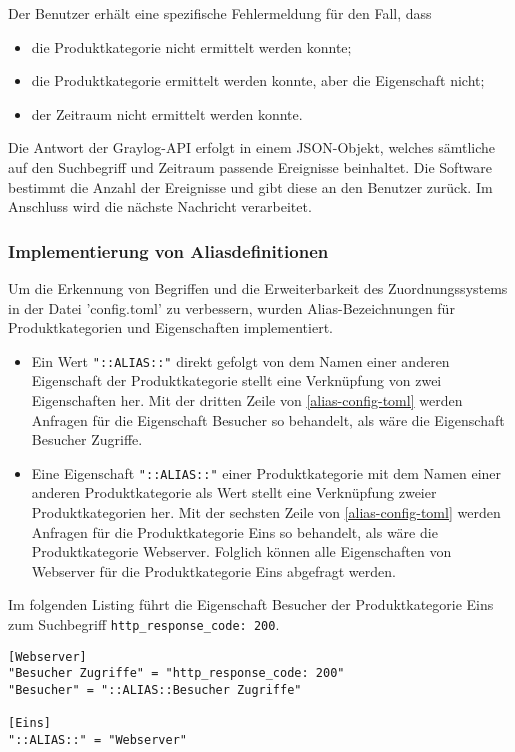 Der Benutzer erhält eine spezifische Fehlermeldung für den Fall, dass

\begin{itemize}
\item die Produktkategorie nicht ermittelt werden konnte;
\item die Produktkategorie ermittelt werden konnte, aber die Eigenschaft nicht;
\item der Zeitraum nicht ermittelt werden konnte.
\end{itemize}

Die Antwort der Graylog-API erfolgt in einem JSON-Objekt, welches sämtliche auf den Suchbegriff und Zeitraum passende Ereignisse beinhaltet. Die Software bestimmt die Anzahl der Ereignisse und gibt diese an den Benutzer zurück. Im Anschluss wird die nächste Nachricht verarbeitet.

\subsubsection{Implementierung von Aliasdefinitionen}
\label{sec:aliasdef}

Um die Erkennung von Begriffen und die Erweiterbarkeit des Zuordnungssystems in der Datei 'config.toml' zu verbessern, wurden Alias-Bezeichnungen für Produktkategorien und Eigenschaften implementiert. 

\newpage

\begin{itemize}
\item Ein Wert \lstinline{"::ALIAS::"} direkt gefolgt von dem Namen einer anderen Eigenschaft der Produktkategorie stellt eine Verknüpfung von zwei Eigenschaften her. Mit der dritten Zeile von \autoref{alias-config-toml} werden Anfragen für die Eigenschaft Besucher so behandelt, als wäre die Eigenschaft Besucher Zugriffe.
\item Eine Eigenschaft \lstinline{"::ALIAS::"} einer Produktkategorie mit dem Namen einer anderen Produktkategorie als Wert stellt eine Verknüpfung zweier Produktkategorien her. Mit der sechsten Zeile  von \autoref{alias-config-toml} werden Anfragen für die Produktkategorie Eins so behandelt, als wäre die Produktkategorie Webserver. Folglich können alle Eigenschaften von Webserver für die Produktkategorie Eins abgefragt werden.
\end{itemize}

Im folgenden Listing führt die Eigenschaft Besucher der Produktkategorie Eins zum Suchbegriff \lstinline{http_response_code: 200}.

\begin{lstlisting}[caption={Beispiel für Aliasdefinitionen in der Datei config.toml}, label=alias-config-toml, xleftmargin=6mm]
[Webserver]
"Besucher Zugriffe" = "http_response_code: 200"
"Besucher" = "::ALIAS::Besucher Zugriffe"

[Eins]
"::ALIAS::" = "Webserver"
\end{lstlisting}
